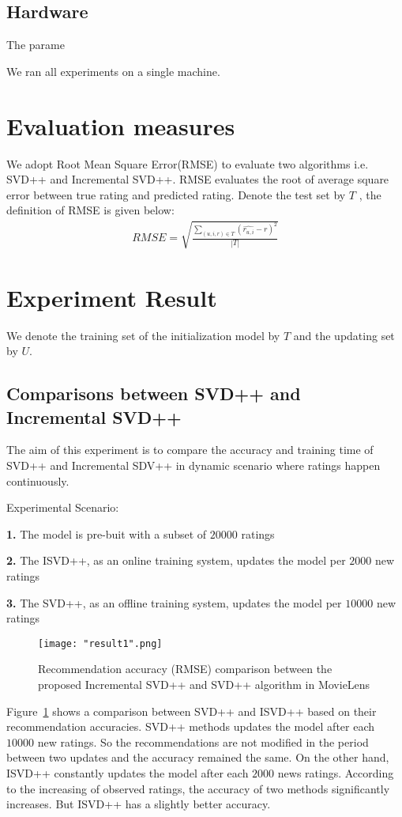 \documentclass[oneside,13pt]{extreport}
\begin{document}
\subsection{Hardware}
The parame

We ran all experiments on a single machine.


\section{Evaluation measures}
We adopt Root Mean Square Error(RMSE) to evaluate two algorithms i.e. SVD++ and Incremental SVD++.
RMSE evaluates the root of average square error between true rating and predicted rating. Denote the test set by $T$ , the definition of RMSE is given below:
\begin{eqnarray}
\label{eq:RMSE}
RMSE = \sqrt {\frac{{\sum\limits_{(u,i,r) \in T} {{{(\widehat {{r_{u,i}}} - r)}^2}} }}{{\left| T \right|}}} 
 \end{eqnarray}

\section{Experiment Result}
We denote the training set of the initialization model by $T$ and the updating set by $U$.  

\subsection{Comparisons between SVD++ and Incremental SVD++}
The aim of this experiment is to compare the accuracy and training time of SVD++ and Incremental SDV++ in dynamic scenario where ratings happen continuously. 

Experimental Scenario: 
\begin{description}
    \item{\textbf{1.}} The model is pre-buit with a subset of $20000$ ratings
    \item{\textbf{2.}} The ISVD++, as an online training system, updates the model per $2000$ new ratings
    \item{\textbf{3.}} The SVD++, as an offline training system, updates the model per $10000$ new ratings
\end{description}



\clearpage
\begin{figure}[h!]
    \centering
    \texttt{[image: "result1".png]} 
    \caption{ Recommendation accuracy (RMSE) comparison between the proposed Incremental SVD++ and SVD++ algorithm in MovieLens}
    \label{fig:RMSE}
\end{figure}
Figure~\ref{fig:RMSE} shows a comparison between SVD++ and ISVD++ based on their recommendation accuracies. SVD++ methods updates the model after each $10000$ new ratings. So the recommendations are not modified in the period between two updates and the accuracy remained the same. On the other hand, ISVD++ constantly updates the model after each $2000$ news ratings. According to the increasing of observed ratings, the accuracy of two methods significantly increases. But ISVD++ has a slightly better accuracy.
\end{document}
